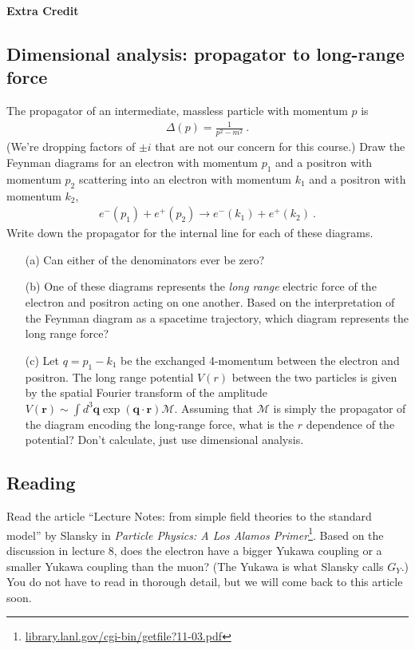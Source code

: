 \documentclass[12pt]{article}
\begin{document}
\appendix
\vspace{1em}
{\Large\textbf{Extra Credit}}






\subsection{Dimensional analysis: propagator to long-range force}

The propagator of an intermediate, massless particle with momentum $p$ is
\begin{align}
	\Delta(p) = \frac{1}{p^2 - m^2} \ .
\end{align}
(We're dropping factors of $\pm i$ that are not our concern for this course.) Draw the Feynman diagrams for an electron with momentum $p_1$ and a positron with momentum $p_2$ scattering into an electron with momentum $k_1$ and a positron with momentum $k_2$,
\begin{align}
	e^-(p_1) + e^+(p_2) \to e^-(k_1) + e^+(k_2) \ .
\end{align} 
Write down the propagator for the internal line for each of these diagrams. 
\begin{enumerate}
	\item[(a)] Can either of the denominators ever be zero?
	\item[(b)] One of these diagrams represents the \emph{long range} electric force of the electron and positron acting on one another. Based on the interpretation of the Feynman diagram as a spacetime trajectory, which diagram represents the long range force?
	\item[(c)] Let $q = p_1 - k_1$ be the exchanged 4-momentum between the electron and positron. The long range potential $V(r)$ between the two particles is given by the spatial Fourier transform of the amplitude $V(\mathbf{r})\sim\int d^3\mathbf{q} \exp\left(\textbf{q}\cdot \textbf{r}\right) \mathcal M$. Assuming that $\mathcal M$ is simply the propagator of the diagram encoding the long-range force, what is the $r$ dependence of the potential? Don't calculate, just use dimensional analysis. 
\end{enumerate}


\subsection{Reading}

Read the article ``Lecture Notes: from simple field theories to the standard model'' by Slansky in \emph{Particle Physics: A Los Alamos Primer}\footnote{\url{library.lanl.gov/cgi-bin/getfile?11-03.pdf}}. Based on the discussion in lecture 8, does the electron have a bigger Yukawa coupling or a smaller Yukawa coupling than the muon? (The Yukawa is what Slansky calls $G_Y$.) You do not have to read in thorough detail, but we will come back to this article soon.
\end{document}
